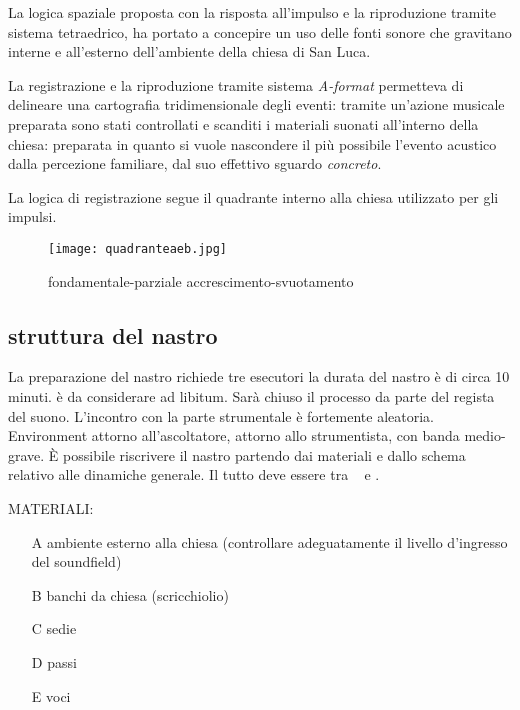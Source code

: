 La logica spaziale proposta con la risposta all'impulso e la riproduzione tramite sistema
tetraedrico, ha portato a concepire un uso delle fonti sonore che gravitano interne e
all’esterno dell'ambiente della chiesa di San Luca.

La registrazione e la riproduzione tramite sistema \emph{A-format} permetteva di delineare una
cartografia tridimensionale degli eventi: tramite un'azione musicale preparata sono stati
controllati e scanditi i materiali suonati all'interno della chiesa: preparata in quanto
si vuole nascondere il più possibile l’evento acustico dalla percezione familiare, dal
suo effettivo sguardo \emph{concreto}.

La logica di registrazione segue il quadrante interno alla chiesa utilizzato per gli impulsi.



\begin{figure}[h]
\centering
{\texttt{[image: quadranteaeb.jpg]}}
\caption[Passaggio microtonale]{fondamentale-parziale accrescimento-svuotamento}
\label{fig:microtoni}
\end{figure}

\subsection{struttura del nastro}

La preparazione del nastro richiede tre esecutori
la durata del nastro è di circa 10 minuti.
è da considerare ad libitum. Sarà chiuso il processo da parte del regista del suono.
L'incontro con la parte strumentale è fortemente aleatoria. Environment attorno all’ascoltatore,
attorno allo strumentista, con banda medio-grave. È possibile riscrivere il nastro
partendo dai materiali e dallo schema relativo alle dinamiche generale. Il tutto deve
essere tra \ppp\ppp ~ e \pp .

\bigskip

MATERIALI:

\begin{enumerate}
	\item [A] ambiente esterno alla chiesa \newline (controllare adeguatamente il livello d'ingresso del soundfield)
	\item [B] banchi da chiesa (scricchiolio)
	\item [C] sedie
	\item [D] passi
	\item [E] voci
\end{enumerate}


